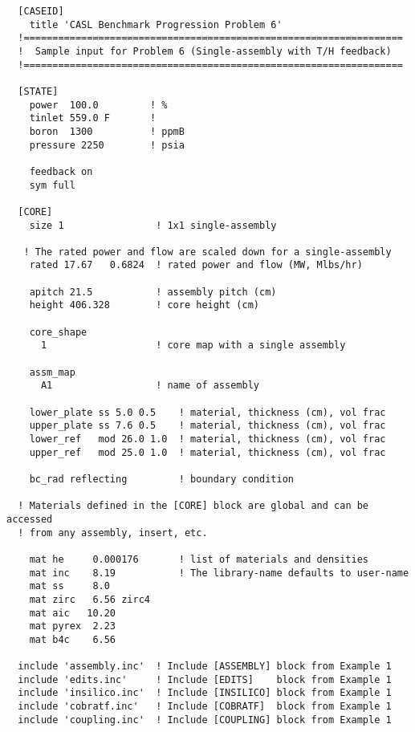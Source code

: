%
%
%
\begin{verbatim}
  [CASEID]
    title 'CASL Benchmark Progression Problem 6'
  !==================================================================
  !  Sample input for Problem 6 (Single-assembly with T/H feedback)
  !==================================================================

  [STATE]
    power  100.0         ! %
    tinlet 559.0 F       !
    boron  1300          ! ppmB
    pressure 2250        ! psia

    feedback on
    sym full

  [CORE]
    size 1                ! 1x1 single-assembly

   ! The rated power and flow are scaled down for a single-assembly
    rated 17.67   0.6824  ! rated power and flow (MW, Mlbs/hr)

    apitch 21.5           ! assembly pitch (cm)
    height 406.328        ! core height (cm)

    core_shape
      1                   ! core map with a single assembly

    assm_map
      A1                  ! name of assembly

    lower_plate ss 5.0 0.5    ! material, thickness (cm), vol frac
    upper_plate ss 7.6 0.5    ! material, thickness (cm), vol frac
    lower_ref   mod 26.0 1.0  ! material, thickness (cm), vol frac
    upper_ref   mod 25.0 1.0  ! material, thickness (cm), vol frac

    bc_rad reflecting         ! boundary condition

  ! Materials defined in the [CORE] block are global and can be accessed
  ! from any assembly, insert, etc.

    mat he     0.000176       ! list of materials and densities
    mat inc    8.19           ! The library-name defaults to user-name
    mat ss     8.0
    mat zirc   6.56 zirc4
    mat aic   10.20
    mat pyrex  2.23
    mat b4c    6.56

  include 'assembly.inc'  ! Include [ASSEMBLY] block from Example 1
  include 'edits.inc'     ! Include [EDITS]    block from Example 1
  include 'insilico.inc'  ! Include [INSILICO] block from Example 1
  include 'cobratf.inc'   ! Include [COBRATF]  block from Example 1
  include 'coupling.inc'  ! Include [COUPLING] block from Example 1
\end{verbatim}

